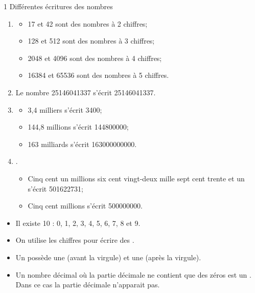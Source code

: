 \documentclass[12pt,a4paper]{article}
\begin{document}
\begin{myactrep}{1 Différentes écritures des nombres}
	
	\begin{enumerate}
		\item 
			\begin{itemize}
				\item 17 et 42 sont des nombres à 2 chiffres;
				\item 128 et 512 sont des nombres à 3 chiffres;
				\item \num{2048} et \num{4096} sont des nombres à 4 chiffres;
				\item \num{16384} et \num{65536} sont des nombres à 5 chiffres.
			\end{itemize}
		
		\item Le nombre 25146041337 s'écrit \num{25146041337}.
		\item 
			\begin{itemize}
				\item 3,4 milliers s'écrit \num{3400};
				\item 144,8 millions s'écrit \num{144800000};
				\item 163 milliards s'écrit \num{163000000000}.
			\end{itemize}
		
		\item .
			\begin{itemize}
				\item Cinq cent un millions six cent vingt-deux mille sept cent trente et un s'écrit \num{501622731};
				\item Cinq cent millions s'écrit \num{500000000}.
			\end{itemize}

	\end{enumerate}
\end{myactrep}


\begin{mydefs}
	\begin{itemize}
		\item Il existe 10  : 0, 1, 2, 3, 4, 5, 6, 7, 8 et 9.
		
		\item On utilise les chiffres pour écrire des .
		
		\item Un  possède une  (avant la virgule) et une  (après la virgule).
		
		\item Un nombre décimal où la partie décimale ne contient que des zéros est un . Dans ce cas la partie décimale n'apparait pas.
	\end{itemize}
\end{mydefs}
\end{document}
